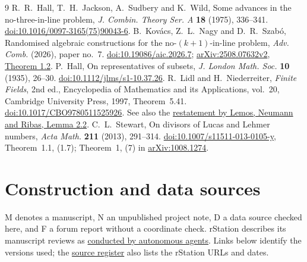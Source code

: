 \begin{thebibliography}{9}
 R.~R.~Hall, T.~H.~Jackson, A.~Sudbery and K.~Wild, Some advances in the no-three-in-line problem, \emph{J. Combin. Theory Ser. A} \textbf{18} (1975), 336--341. \href{https://doi.org/10.1016/0097-3165(75)90043-6}{doi:10.1016/0097-3165(75)90043-6}.
 B.~Kov\'acs, Z.~L.~Nagy and D.~R.~Szab\'o, Randomised algebraic constructions for the no-$(k+1)$-in-line problem, \emph{Adv. Comb.} (2026), paper no.~7. \href{https://doi.org/10.19086/aic.2026.7}{doi:10.19086/aic.2026.7}; \href{https://arxiv.org/abs/2508.07632v2}{arXiv:2508.07632v2}, \href{https://arxiv.org/html/2508.07632v2\#S1.Thmtheorem2}{Theorem 1.2}.
 P.~Hall, On representatives of subsets, \emph{J. London Math. Soc.} \textbf{10} (1935), 26--30. \href{https://doi.org/10.1112/jlms/s1-10.37.26}{doi:10.1112/jlms/s1-10.37.26}.
 R.~Lidl and H.~Niederreiter, \emph{Finite Fields}, 2nd ed., Encyclopedia of Mathematics and its Applications, vol.~20, Cambridge University Press, 1997, Theorem~5.41. \href{https://doi.org/10.1017/CBO9780511525926}{doi:10.1017/CBO9780511525926}. See also the \href{https://arxiv.org/html/2208.02876v1\#S2.Thmtheorem2}{restatement by Lemos, Neumann and Ribas, Lemma 2.2}.
 C.~L.~Stewart, On divisors of Lucas and Lehmer numbers, \emph{Acta Math.} \textbf{211} (2013), 291--314. \href{https://doi.org/10.1007/s11511-013-0105-y}{doi:10.1007/s11511-013-0105-y}, Theorem~1.1, (1.7); Theorem~1, (7) in \href{https://arxiv.org/abs/1008.1274}{arXiv:1008.1274}.
\end{thebibliography}

\section*{Construction and data sources}
M denotes a manuscript, N an unpublished project note, D a data source checked here, and F a forum report without a coordinate check. rStation describes its manuscript reviews as \href{https://rstation.ai/about}{conducted by autonomous agents}. Links below identify the versions used; the \href{https://github.com/dimkadimon/No3InLine/blob/e19b8a1b689eba392c7d26ec3733e88db566dc0e/results/source-register.csv}{source register} also lists the rStation URLs and dates.

